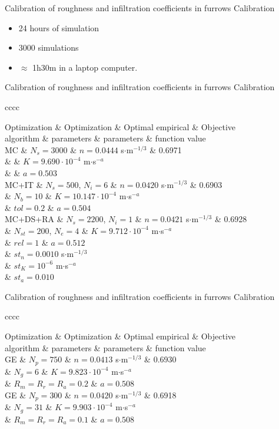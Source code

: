 \documentclass[10pt]{beamer}
\newcommand{\TABLE}[3]
{
	\begin{table}[ht!]
		\centering
		#1
		\tabulinesep=0.9mm
		\begin{tabu}{#2}
			#3
		\end{tabu}
	\end{table}
}
\begin{document}
\begin{frame}{Calibration of roughness and infiltration coefficients in furrows}
{Calibration}
	\begin{itemize}
		\item 24 hours of simulation
		\item 3000 simulations
		\item $\approx$ 1h30m in a laptop computer.
	\end{itemize}
\end{frame}

\begin{frame}{Calibration of roughness and infiltration coefficients in furrows}
{Calibration}
\TABLE{\tiny}{cccc}
{
	Optimization & Optimization & Optimal empirical & Objective
	\\ algorithm & parameters & parameters & function value
	\\ \hline
	MC & $N_s=3000$ & $n=0.0444$ s$\cdot$m$^{-1/3}$ & 0.6971
	\\ & & $K=9.690\cdot 10^{-4}$ m$\cdot$s$^{-a}$
	\\ & & $a=0.503$
	\\ \hline
	MC+IT & $N_s=500$, $N_i=6$ & $n=0.0420$ s$\cdot$m$^{-1/3}$ & 0.6903
	\\ & $N_b=10$ & $K=10.147\cdot 10^{-4}$ m$\cdot$s$^{-a}$
	\\ & $tol=0.2$ & $a=0.504$
	\\ \hline
	MC+DS+RA & $N_s=2200$, $N_i=1$ & $n=0.0421$ s$\cdot$m$^{-1/3}$ & 0.6928
	\\ & $N_{st}=200$, $N_e=4$ & $K=9.712\cdot 10^{-4}$ m$\cdot$s$^{-a}$
	\\ & $rel=1$ & $a=0.512$
	\\ & $st_n=0.0010$ s$\cdot$m$^{-1/3}$
	\\ & $st_K=10^{-6}$ m$\cdot$s$^{-a}$
	\\ & $st_a=0.010$
	\\ \hline
}
\end{frame}

\begin{frame}{Calibration of roughness and infiltration coefficients in furrows}
{Calibration}
\TABLE{\tiny}{cccc}
{
	Optimization & Optimization & Optimal empirical & Objective
	\\ algorithm & parameters & parameters & function value
	\\ \hline
	GE & $N_p=750$ & $n=0.0413$ s$\cdot$m$^{-1/3}$  & 0.6930
	\\ & $N_g=6$ & $K=9.823\cdot 10^{-4}$ m$\cdot$s$^{-a}$
	\\ & $R_m=R_r=R_a=0.2$ & $a=0.508$
	\\ \hline
	GE & $N_p=300$ & $n=0.0420$ s$\cdot$m$^{-1/3}$  & 0.6918
	\\ & $N_g=31$ & $K=9.903\cdot 10^{-4}$ m$\cdot$s$^{-a}$
	\\ & $R_m=R_r=R_a=0.1$ & $a=0.508$
	\\ \hline
}
\end{frame}
\end{document}
